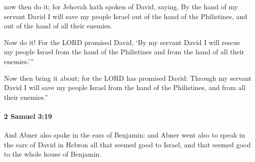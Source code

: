 			\begin{versebox}
					\item[BHS] 
					\item[ASV] now then do it; for Jehovah hath spoken of David, saying, By the hand of my servant David I will save my people Israel out of the hand of the Philistines, and out of the hand of all their enemies.
					\item[NIV] Now do it! For the LORD promised David, ‘By my servant David I will rescue my people Israel from the hand of the Philistines and from the hand of all their enemies.’”
					\item[NRSV] Now then bring it about; for the LORD has promised David: Through my servant David I will save my people Israel from the hand of the Philistines, and from all their enemies.”
			\end{versebox}

		\paragraph{2 Samuel 3:19} %
			\label{2SAMUEL-3-19}

			And Abner also spake in the ears of Benjamin: and Abner went also to speak in the ears of David in Hebron all that seemed good to Israel, and that seemed good to the whole house of Benjamin.


